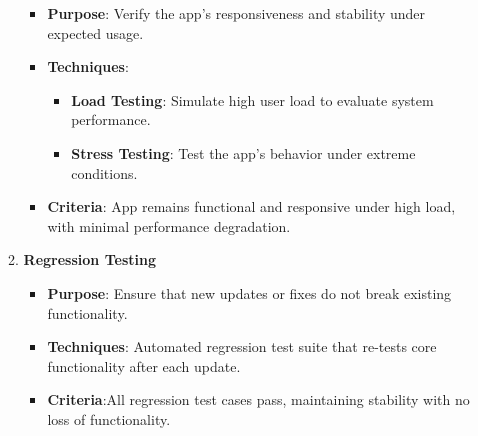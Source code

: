 \documentclass[12pt, titlepage]{article}
\begin{document}
\begin{enumerate}
\begin{enumerate}
\begin{itemize}
			\item \textbf{Purpose}: Verify the app's responsiveness and stability under expected usage.
			\item \textbf{Techniques}: 
			\begin{itemize}
				\item \textbf{Load Testing}: Simulate high user load to evaluate system performance.
				\item \textbf{Stress Testing}: Test the app's behavior under extreme conditions.
			\end{itemize}
			\item \textbf{Criteria}: App remains functional and responsive under high load, with minimal performance degradation.
		\end{itemize}
		\item \textbf{Regression Testing}
		\begin{itemize}
			\item \textbf{Purpose}: Ensure that new updates or fixes do not break existing functionality.
			\item \textbf{Techniques}: Automated regression test suite that re-tests core functionality after each update.
			\item \textbf{Criteria}:All regression test cases pass, maintaining stability with no loss of functionality.
		\end{itemize}
	\end{enumerate}


\end{enumerate}
\end{document}
